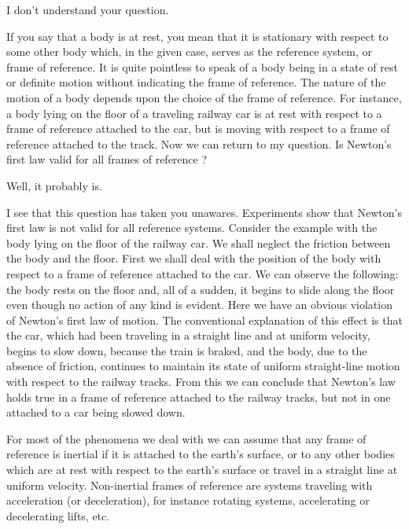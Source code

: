 \begin{s}
I don't understand your question. 
\end{s}


\begin{p}
If you say that a body is at rest, you mean that it is stationary with respect to some other body which, in the given case, serves as the reference system, or frame of reference. It is quite pointless to speak of a body being in a state of rest or definite motion without indicating the frame of reference. The nature of the motion of a body depends upon the choice of the frame of reference. For instance, a body lying on the floor of a traveling railway car is at rest with respect to a frame of reference attached to the car, but is moving with respect to a frame of reference attached to the track. Now we can return to my question. Is Newton's first law valid for all frames of reference ?
\end{p}


\begin{s}
Well, it probably is.
\end{s}




\begin{p}
I see that this question has taken you unawares. Experiments show that Newton's first law is not valid for all reference systems. Consider the example with the body lying on the floor of the railway car. We shall neglect the friction between the body and the floor. First we shall deal with the position of the body with respect to a frame of reference attached to the car. We can observe the following: the body rests on the floor and, all of a sudden, it begins to slide along the floor even though no action of any kind is evident. Here we have an obvious violation of Newton's first law of motion. The conventional explanation of this effect is that the car, which had been traveling in a straight line and at uniform velocity, begins to slow down, because the train is braked, and the body, due to the absence of friction, continues to maintain its state of uniform straight-line motion with respect to the railway tracks. From this we can conclude that Newton's law holds true in a frame of reference attached to the railway tracks, but not in one attached to a car being slowed down.

 For most of the phenomena we deal with we can assume that any frame of reference is inertial if it is attached to the earth's surface, or to any other bodies which are at rest with respect to the earth's surface or travel in a straight line at uniform velocity. Non-inertial frames of reference are systems traveling with acceleration (or deceleration), for instance rotating systems, accelerating or decelerating lifts, etc. 
\end{p}



